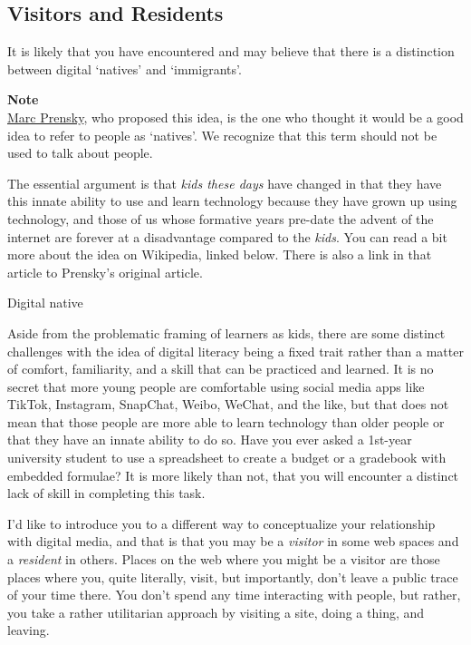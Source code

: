 \documentclass[
]{book}
\theoremstyle{definition}
\theoremstyle{definition}
\theoremstyle{definition}
\theoremstyle{definition}
\theoremstyle{remark}
\begin{document}
\hypertarget{visitors-and-residents}{%
\subsection{Visitors and Residents}\label{visitors-and-residents}}

It is likely that you have encountered and may believe that there is a distinction between digital `natives' and `immigrants'.

\begin{caution}
\textbf{Note}\\
\href{https://marcprensky.com/}{Marc Prensky}, who proposed this idea, is the one who thought it would be a good idea to refer to people as `natives'. We recognize that this term should not be used to talk about people.
\end{caution}

The essential argument is that \emph{kids these days} have changed in that they have this innate ability to use and learn technology because they have grown up using technology, and those of us whose formative years pre-date the advent of the internet are forever at a disadvantage compared to the \emph{kids}. You can read a bit more about the idea on Wikipedia, linked below. There is also a link in that article to Prensky's original article.

Digital native

Aside from the problematic framing of learners as kids, there are some distinct challenges with the idea of digital literacy being a fixed trait rather than a matter of comfort, familiarity, and a skill that can be practiced and learned. It is no secret that more young people are comfortable using social media apps like TikTok, Instagram, SnapChat, Weibo, WeChat, and the like, but that does not mean that those people are more able to learn technology than older people or that they have an innate ability to do so. Have you ever asked a 1st-year university student to use a spreadsheet to create a budget or a gradebook with embedded formulae? It is more likely than not, that you will encounter a distinct lack of skill in completing this task.

I'd like to introduce you to a different way to conceptualize your relationship with digital media, and that is that you may be a \emph{visitor} in some web spaces and a \emph{resident} in others. Places on the web where you might be a visitor are those places where you, quite literally, visit, but importantly, don't leave a public trace of your time there. You don't spend any time interacting with people, but rather, you take a rather utilitarian approach by visiting a site, doing a thing, and leaving.
\end{document}
